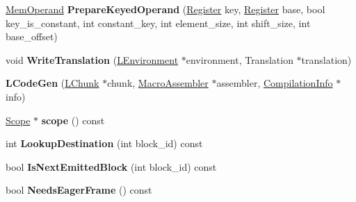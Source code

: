\begin{DoxyCompactItemize}
\item 
\hyperlink{classv8_1_1internal_1_1_mem_operand}{Mem\+Operand} {\bfseries Prepare\+Keyed\+Operand} (\hyperlink{structv8_1_1internal_1_1_register}{Register} key, \hyperlink{structv8_1_1internal_1_1_register}{Register} base, bool key\+\_\+is\+\_\+constant, int constant\+\_\+key, int element\+\_\+size, int shift\+\_\+size, int base\+\_\+offset)\hypertarget{classv8_1_1internal_1_1_l_code_gen_a3b515037866a0dd7cc3f92d474c36b43}{}\label{classv8_1_1internal_1_1_l_code_gen_a3b515037866a0dd7cc3f92d474c36b43}

\item 
void {\bfseries Write\+Translation} (\hyperlink{classv8_1_1internal_1_1_l_environment}{L\+Environment} $\ast$environment, Translation $\ast$translation)\hypertarget{classv8_1_1internal_1_1_l_code_gen_aa6c0dc6868c8926d71543f7d35675b7f}{}\label{classv8_1_1internal_1_1_l_code_gen_aa6c0dc6868c8926d71543f7d35675b7f}

\item 
{\bfseries L\+Code\+Gen} (\hyperlink{classv8_1_1internal_1_1_l_chunk}{L\+Chunk} $\ast$chunk, \hyperlink{classv8_1_1internal_1_1_macro_assembler}{Macro\+Assembler} $\ast$assembler, \hyperlink{classv8_1_1internal_1_1_compilation_info}{Compilation\+Info} $\ast$info)\hypertarget{classv8_1_1internal_1_1_l_code_gen_aed907f71b0a7b9401ce1c0c883ed449b}{}\label{classv8_1_1internal_1_1_l_code_gen_aed907f71b0a7b9401ce1c0c883ed449b}

\item 
\hyperlink{classv8_1_1internal_1_1_scope}{Scope} $\ast$ {\bfseries scope} () const \hypertarget{classv8_1_1internal_1_1_l_code_gen_a2b85c964ccc4e59f50d49d19b0ed5ce0}{}\label{classv8_1_1internal_1_1_l_code_gen_a2b85c964ccc4e59f50d49d19b0ed5ce0}

\item 
int {\bfseries Lookup\+Destination} (int block\+\_\+id) const \hypertarget{classv8_1_1internal_1_1_l_code_gen_aed7b32e45855e787600f16ad151865c4}{}\label{classv8_1_1internal_1_1_l_code_gen_aed7b32e45855e787600f16ad151865c4}

\item 
bool {\bfseries Is\+Next\+Emitted\+Block} (int block\+\_\+id) const \hypertarget{classv8_1_1internal_1_1_l_code_gen_a679c74faee0e58ff843fdfa52dc927a9}{}\label{classv8_1_1internal_1_1_l_code_gen_a679c74faee0e58ff843fdfa52dc927a9}

\item 
bool {\bfseries Needs\+Eager\+Frame} () const \hypertarget{classv8_1_1internal_1_1_l_code_gen_a3487a9e332e1674eeac175bdd43851bd}{}\label{classv8_1_1internal_1_1_l_code_gen_a3487a9e332e1674eeac175bdd43851bd}


\end{DoxyCompactItemize}
